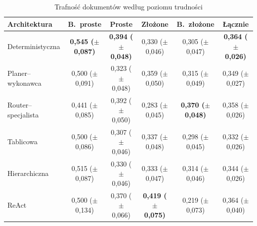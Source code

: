   \begin{table}[H]
    \caption{Trafność dokumentów według poziomu trudności}\label{tab:trafnosc-trudnosc}
    \centering
    \footnotesize
    \renewcommand{\arraystretch}{1.3}
    \begin{tabular}{@{} l c c c c c @{}}
      \toprule
      \textbf{Architektura}
      & \textbf{B.~proste}
      & \textbf{Proste}
      & \textbf{Złożone}
      & \textbf{B.~złożone}
      & \textbf{Łącznie}                                                                                                                                                                  \\
      \midrule
      Deterministyczna    & \textbf{0{,}545 (\(\pm\) 0{,}087)} & \textbf{0{,}394 (\(\pm\) 0{,}048)} & 0{,}330 (\(\pm\) 0{,}046)          & 0{,}305 (\(\pm\) 0{,}047)          & \textbf{0{,}364 (\(\pm\) 0{,}026)} \\
      Planer--wykonawca   & 0{,}500 (\(\pm\) 0{,}091)          & 0{,}323 (\(\pm\) 0{,}048)          & 0{,}359 (\(\pm\) 0{,}050)          & 0{,}315 (\(\pm\) 0{,}049)          & 0{,}349 (\(\pm\) 0{,}027)          \\
      Router--specjalista & 0{,}441 (\(\pm\) 0{,}085)          & 0{,}392 (\(\pm\) 0{,}050)          & 0{,}283 (\(\pm\) 0{,}045)          & \textbf{0{,}370 (\(\pm\) 0{,}048)} & 0{,}358 (\(\pm\) 0{,}026)          \\
      Tablicowa           & 0{,}500 (\(\pm\) 0{,}086)          & 0{,}307 (\(\pm\) 0{,}046)          & 0{,}337 (\(\pm\) 0{,}048)          & 0{,}298 (\(\pm\) 0{,}045)          & 0{,}332 (\(\pm\) 0{,}026)          \\
      Hierarchiczna       & 0{,}515 (\(\pm\) 0{,}087)          & 0{,}330 (\(\pm\) 0{,}046)          & 0{,}333 (\(\pm\) 0{,}047)          & 0{,}314 (\(\pm\) 0{,}046)          & 0{,}344 (\(\pm\) 0{,}026)          \\
      ReAct               & 0{,}500 (\(\pm\) 0{,}134)          & 0{,}370 (\(\pm\) 0{,}066)          & \textbf{0{,}419 (\(\pm\) 0{,}075)} & 0{,}219 (\(\pm\) 0{,}073)          & 0{,}364 (\(\pm\) 0{,}040)          \\
      \bottomrule
    \end{tabular}
  \end{table}

